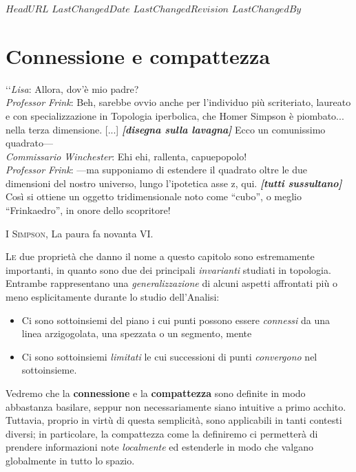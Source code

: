 \svnidlong
{$HeadURL$}
{$LastChangedDate$}
{$LastChangedRevision$}
{$LastChangedBy$}

\chapter{Connessione e compattezza}

\begin{introduction}
‘‘\emph{Lisa}: Allora, dov'è mio padre?\\
\emph{Professor Frink}: Beh, sarebbe ovvio anche per l'individuo più scriteriato, laureato e con specializzazione in Topologia iperbolica, che Homer Simpson è piombato... nella terza dimensione. [...] \emph{\textbf{[disegna sulla lavagna]}} Ecco un comunissimo quadrato—\\
\emph{Commissario Winchester}: Ehi ehi, rallenta, capuepopolo!\\
\emph{Professor Frink}: —ma supponiamo di estendere il quadrato oltre le due dimensioni del nostro universo, lungo l'ipotetica asse z, qui. \emph{\textbf{[tutti sussultano]}} Così si ottiene un oggetto tridimensionale noto come “cubo”, o meglio “Frinkaedro”, in onore dello scopritore!
\begin{flushright}
	\textsc{I Simpson,} La paura fa novanta VI.
\end{flushright}
\end{introduction}
\lettrine[findent=1pt, nindent=0pt]{L}{e} due proprietà che danno il nome a questo capitolo sono estremamente importanti, in quanto sono due dei principali \textit{invarianti} studiati in topologia. Entrambe rappresentano una \textit{generalizzazione} di alcuni aspetti affrontati più o meno esplicitamente durante lo studio dell'Analisi:
\begin{itemize}
	\item Ci sono sottoinsiemi del piano i cui punti possono essere \textit{connessi} da una linea arzigogolata, una spezzata o un segmento, mente
	\item Ci sono sottoinsiemi \textit{limitati} le cui successioni di punti \textit{convergono} nel sottoinsieme.
\end{itemize}
Vedremo che la \textbf{connessione} e la \textbf{compattezza} sono definite in modo abbastanza basilare, seppur non necessariamente siano intuitive a primo acchito. Tuttavia, proprio in virtù di questa semplicità, sono applicabili in tanti contesti diversi; in particolare, la compattezza come la definiremo ci permetterà di prendere informazioni note \textit{localmente} ed estenderle in modo che valgano globalmente in tutto lo spazio.
